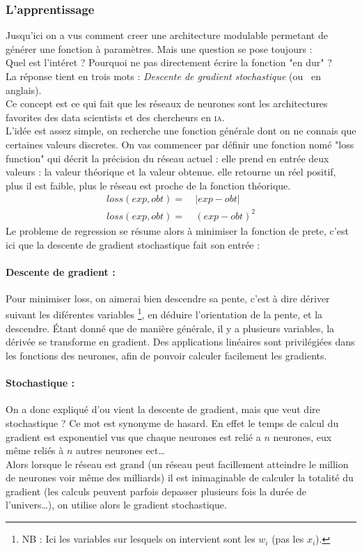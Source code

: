 \subsubsection{L'apprentissage}
Jusqu'ici on a vus comment creer une architecture modulable permetant de générer une fonction à paramètres.
Mais une question se pose toujours :\\
Quel est l'intéret ?
Pourquoi ne pas directement écrire la fonction "en dur" ?\\
La réponse tient en trois mots : \textit{Descente de gradient stochastique} (ou  \sgd\ en anglais). \\
Ce concept est ce qui fait que les réseaux de neurones sont les architectures favorites
des data scientists et des chercheurs en \textsc{ia}.\\


L'idée est assez simple, on recherche une fonction générale dont on ne connais que certaines valeurs discretes.
On vas commencer par définir une fonction nomé "loss function"
qui décrit la précision du réseau actuel :
elle prend en entrée deux valeurs : la valeur théorique et la valeur obtenue.
elle retourne un réel positif, plus il est faible, plus le réseau est proche de la fonction théorique.
\exemle
{
\begin{align*}
    loss(exp, obt) = &\ |exp - obt| \\
    loss(exp, obt) = &\ (exp - obt)^2
\end{align*}
}
Le probleme de regression se résume alors à minimiser la fonction de prete,
c'est ici que la descente de gradient stochastique fait son entrée :


\paragraph{Descente de gradient :}
Pour minimiser loss, on aimerai bien descendre sa pente, c'est à dire dériver suivant les diférentes variables
\footnote{\textsc{NB :} Ici les variables sur lesquels on intervient sont les $w_i$ (pas les $x_i$).},
en déduire l'orientation de la pente, et la descendre.
Étant donné que de manière générale, il y a plusieurs variables, la dérivée se transforme en gradient.
Des applications linéaires sont privilégiées dans les fonctions des neurones,
afin de pouvoir calculer facilement les gradients.\\


\paragraph{Stochastique :}
On a donc expliqué d'ou vient la descente de gradient, mais que veut dire stochastique ?
Ce mot est synonyme de hasard.
En effet le temps de calcul du gradient est exponentiel vus que chaque neurones est relié a $n$ neurones,
eux même reliés à $n$ autres neurones ect\ldots\\
Alors lorsque le réseau est grand
(un réseau peut facillement atteindre le million de neurones voir même des milliards\cite{i3espectrum})
il est inimaginable de calculer la totalité du gradient (les calculs peuvent parfois depasser
plusieurs fois la durée de l'univers\ldots),
on utilise alors le gradient stochastique.\\


